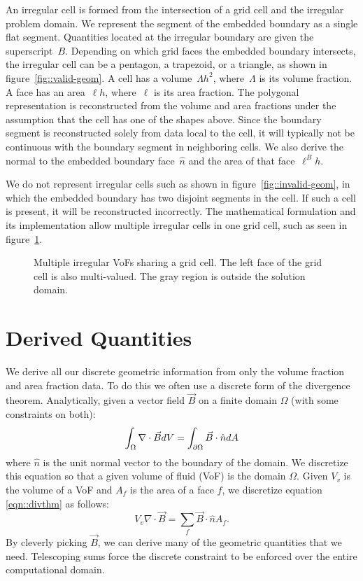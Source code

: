 An irregular cell is formed from the intersection of a grid cell and
the irregular problem domain.  We represent the segment of the
embedded boundary as a single flat segment.  Quantities located at the
irregular boundary are given the superscript~$B$.  Depending on which
grid faces the embedded boundary intersects, the irregular cell
can be a pentagon, a trapezoid, or a triangle, as shown in
figure~\ref{fig::valid-geom}.  A cell has a
volume~$\Lambda h^2$, where~$\Lambda$ is its volume fraction.  A face
has an area~$\ell h$, where~$\ell$ is its area fraction.  The
polygonal representation is reconstructed from the volume and area
fractions under the assumption that the cell has one of the shapes
above.  Since the boundary segment is reconstructed solely from data
local to the cell, it will typically not be continuous with the
boundary segment in neighboring cells.  We also derive the normal to
the embedded boundary face~$\hat{n}$ and the area of that face~$\ell^B
h$.

We do not represent irregular cells such
as shown in figure~\ref{fig::invalid-geom}, in which the embedded
boundary has two disjoint segments in the cell.  If such a cell is
present, it will be reconstructed incorrectly.  
The mathematical formulation and its implementation allow multiple
irregular cells in one grid cell, such as seen in
figure~\ref{fig::multi-vofs}. 


\begin{figure}
\epsfxsize=2.0in
\hspace{2.0in} 
\caption{Multiple irregular VoFs sharing a grid cell.  The 
left face of the grid cell is also multi-valued.  The gray
region is outside the solution domain.}
\label{fig::multi-vofs}
\end{figure}

\section{Derived Quantities}

We derive all our discrete geometric information from
only the volume fraction and area fraction data.   To do this
we often use a discrete form of the divergence theorem.  Analytically,
given a vector field $\vec B$ on a finite domain $\Omega$ (with some
constraints on both):
\begin{equation}
\int_\Omega \nabla \cdot \vec B dV= \int_{\partial \Omega} \vec B \cdot
\hat n dA
\label{eqn::divthm}
\end{equation}
where $\hat n$ is the unit normal vector to the boundary of the
domain.  We discretize this equation so that a given volume of fluid
(VoF) is the  domain $\Omega$.  Given $V_v$ is the volume of a VoF 
and $A_f$ is the area of a face $f$, we discretize equation
\ref{eqn::divthm} as follows:
\begin{equation}
V_v \nabla \cdot \vec B = \sum_f \vec B \cdot \hat n A_f.
\label{eqn::discdivthm}
\end{equation}
By cleverly picking $\vec B$, we can derive many of the geometric
quantities that we need.  Telescoping sums force the discrete 
constraint to be enforced over the entire computational domain.

